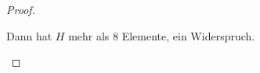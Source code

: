 \begin{proof}
\begin{parts}
	Dann hat $H$ mehr als $8$ Elemente, ein Widerspruch.\qedhere
\end{parts}
\end{proof}
